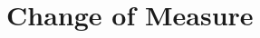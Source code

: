 \documentclass[12pt,a4paper]{book}
\begin{document}

%
%
%
%
%
%
%
%

\chapter{Change of Measure}
\end{document}
